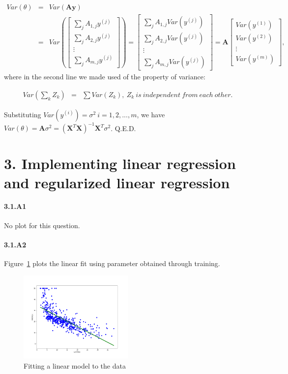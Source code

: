 \documentclass[english,11pt]{article}
\begin{document}
\begin{eqnarray}
Var(\theta) & = & Var(\boldsymbol{A}\boldsymbol{y})\\
 & = & Var(\left[\begin{array}{c}
\sum_{j}A_{1,j}y^{(j)}\\
\sum_{j}A_{2,j}y^{(j)}\\
\vdots\\
\sum_{j}A_{m,j}y^{(j)}
\end{array}\right])=\left[\begin{array}{c}
\sum_{j}A_{1,j}Var(y^{(j)})\\
\sum_{j}A_{2,j}Var(y^{(j)})\\
\vdots\\
\sum_{j}A_{m,j}Var(y^{(j)})
\end{array}\right]=\boldsymbol{A}\left[\begin{array}{c}
Var(y^{(1)})\\
Var(y^{(2)})\\
\vdots\\
Var(y^{(m)})
\end{array}\right],
\end{eqnarray}
where in the second line we made used of the property of variance:

\begin{eqnarray}
Var(\sum_{k}Z_{k}) & = & \sum Var(Z_{k}),\ Z_{k}\ is\ independent\ from\ each\ other.
\end{eqnarray}

Substituting $Var(y^{(i)})=\sigma^{2}\ i=1,2,...,m$, we have $Var(\theta)=\boldsymbol{A}\sigma^{2}=\left(\boldsymbol{X}^{T}\boldsymbol{X}\right)^{-1}\boldsymbol{X}^{T}\sigma^{2}$.
Q.E.D.


\part*{3. Implementing linear regression and regularized linear regression}

\subsection*{3.1.A1}
No plot for this question.

\subsection*{3.1.A2}
Figure~\ref{fig:linear_fit} plots the linear fit using parameter obtained through training.
\begin{figure}[H]
\centering
\includegraphics[width=0.5\textwidth]{../hw1/part1/3_1_A_Linear.png}
\caption{Fitting a linear model to the data}
\label{fig:linear_fit}
\end{figure}
\end{document}
